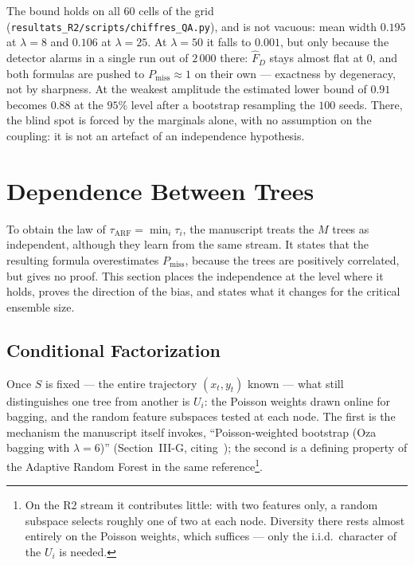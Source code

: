 \documentclass[10pt,conference]{IEEEtran}
\theoremstyle{definition}
\begin{document}
\noindent The bound holds on all $60$ cells of the grid
(\texttt{resultats\_R2/scripts/chiffres\_QA.py}), and is not vacuous: mean width $0.195$
at $\lambda = 8$ and $0.106$ at $\lambda = 25$. At $\lambda = 50$ it falls to $0.001$,
but only because the detector alarms in a single run out of $2\,000$ there: $\hat F_D$ stays
almost flat at $0$, and both formulas are pushed to $P_{\mathrm{miss}} \approx 1$ on their own --- exactness by degeneracy, not by
sharpness. At the weakest amplitude the estimated lower bound of $0.91$ becomes $0.88$ at
the $95\%$ level after a bootstrap resampling the $100$ seeds. There, the blind spot is
forced by the marginals alone, with no assumption on the coupling: it is not an artefact
of an independence hypothesis.

\section{Dependence Between Trees}
\label{sec:B}

To obtain the law of $\tau_{\mathrm{ARF}} = \min_i \tau_i$, the manuscript treats the $M$
trees as independent, although they learn from the same stream. It states that the
resulting formula overestimates $P_{\mathrm{miss}}$, because the trees are positively
correlated, but gives no proof. This section places the independence at the level where it
holds, proves the direction of the bias, and states what it changes for the critical
ensemble size.

\subsection{Conditional Factorization}
\label{sec:factorization}

Once $S$ is fixed --- the entire trajectory $(x_t,y_t)$ known --- what still distinguishes
one tree from another is $U_i$: the Poisson weights drawn online for bagging, and the
random feature subspaces tested at each node. The first is the mechanism the manuscript
itself invokes, ``Poisson-weighted bootstrap (Oza bagging with $\lambda = 6$)''
(Section~III-G, citing~\cite{gomes2017}); the second is a defining property of the
Adaptive Random Forest in the same reference\footnote{On the R2 stream it contributes
little: with two features only, a random subspace selects roughly one of two at each node.
Diversity there rests almost entirely on the Poisson weights, which suffices --- only the
i.i.d.\ character of the $U_i$ is needed.}.
\end{document}
